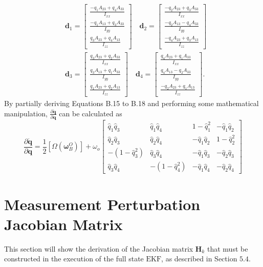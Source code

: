 $$
\begin{aligned}
& \mathbf{d}_{1}=\left[\begin{array}{c}\frac{-q_{1} A_{23}+q_{4} A_{33}}{I_{x x}} \\\frac{-q_{1} A_{13}+q_{3} A_{33}}{I_{y y}} \\\frac{q_{3} A_{23}+q_{4} A_{13}}{I_{z z}}\end{array}\right] \quad \mathbf{d}_{2}=\left[\begin{array}{l}\frac{-q_{2} A_{23}+q_{3} A_{33}}{I_{x x}} \\\frac{-q_{2} A_{13}-q_{4} A_{33}}{I_{y y}} \\\frac{-q_{4} A_{23}+q_{3} A_{13}}{I_{z z}}\end{array}\right] \\
& \mathbf{d}_{3}=\left[\begin{array}{c}\frac{q_{3} A_{23}+q_{2} A_{33}}{I_{x x}} \\\frac{q_{3} A_{13}+q_{1} A_{33}}{I_{y y}} \\\frac{q_{1} A_{23}+q_{2} A_{13}}{I_{z z}}\end{array}\right] \quad \mathbf{d}_{4}=\left[\begin{array}{c}\frac{q_{4} A_{23}+q_{1} A_{33}}{I_{x x}} \\\frac{q_{4} A_{13}-q_{2} A_{33}}{I_{y y}} \\\frac{-q_{2} A_{23}+q_{1} A_{13}}{I_{z z}}\end{array}\right] . 
\end{aligned}
$$
By partially deriving Equations B.15 to B.18 and performing some mathematical manipulation, $\frac{\partial \dot{\mathbf{q}}}{\partial \mathbf{q}}$ can be calculated as
$$
\frac{\partial \dot{\mathbf{q}}}{\partial \mathbf{q}}=\frac{1}{2}\left[\Omega\left(\boldsymbol{\omega}_{B}^{O}\right)\right]+\omega_{o}\left[\begin{array}{cccc}
\hat{q}_{1} \hat{q}_{3} & \hat{q}_{1} \hat{q}_{4} & 1-\hat{q}_{1}^{2} & -\hat{q}_{1} \hat{q}_{2} \\
\hat{q}_{2} \hat{q}_{3} & \hat{q}_{2} \hat{q}_{4} & -\hat{q}_{1} \hat{q}_{2} & 1-\hat{q}_{2}^{2} \\
-\left(1-\hat{q}_{3}^{2}\right) & \hat{q}_{3} \hat{q}_{4} & -\hat{q}_{1} \hat{q}_{3} & -\hat{q}_{2} \hat{q}_{3} \\
\hat{q}_{3} \hat{q}_{4} & -\left(1-\hat{q}_{4}^{2}\right) & -\hat{q}_{1} \hat{q}_{4} & -\hat{q}_{2} \hat{q}_{4}
\end{array}\right]
$$

\chapter{Measurement Perturbation Jacobian Matrix}
\makeatletter{}\makeatother
\label{chap:Measurement Perturbation Jacobian Matrix}
This section will show the derivation of the Jacobian matrix $\mathbf{H}_{k}$ that must be constructed in the execution of the full state $\mathrm{EKF}$, as described in Section $5.4 .$

